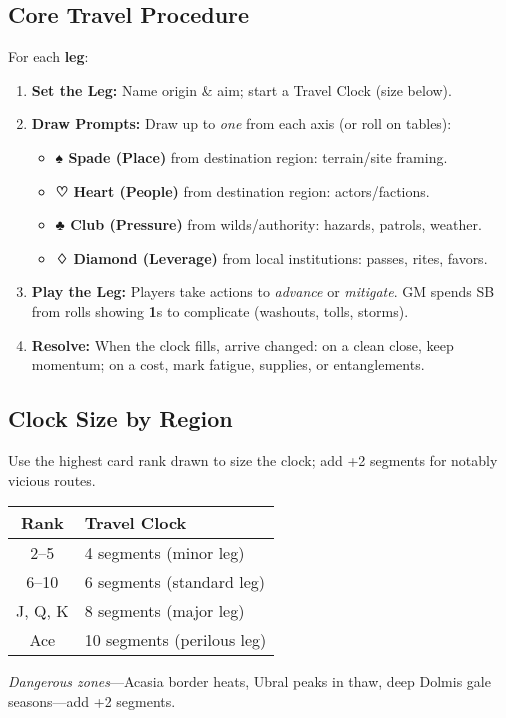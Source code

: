\begin{multicols}{2}
\subsection*{Core Travel Procedure}
For each \textbf{leg}:
\begin{enumerate}
  \item \textbf{Set the Leg:} Name origin \& aim; start a Travel Clock (size below).
  \item \textbf{Draw Prompts:} Draw up to \emph{one} from each axis (or roll on tables):
  \begin{itemize}
    \item \textbf{♠ Spade (Place)} from destination region: terrain/site framing.
    \item \textbf{♡ Heart (People)} from destination region: actors/factions.
    \item \textbf{♣ Club (Pressure)} from wilds/authority: hazards, patrols, weather.
    \item \textbf{♢ Diamond (Leverage)} from local institutions: passes, rites, favors.
  \end{itemize}
  \item \textbf{Play the Leg:} Players take actions to \emph{advance} or \emph{mitigate}. GM spends SB from rolls showing \textbf{1}s to complicate (washouts, tolls, storms).
  \item \textbf{Resolve:} When the clock fills, arrive changed: on a clean close, keep momentum; on a cost, mark fatigue, supplies, or entanglements.
\end{enumerate}

\subsection*{Clock Size by Region}
Use the highest card rank drawn to size the clock; add +2 segments for notably vicious routes.
\begin{center}
\begin{tabular}{cl}
\toprule
\textbf{Rank} & \textbf{Travel Clock} \\
\midrule
2–5 & 4 segments (minor leg) \\
6–10 & 6 segments (standard leg) \\
J, Q, K & 8 segments (major leg) \\
Ace & 10 segments (perilous leg) \\
\bottomrule
\end{tabular}
\end{center}
\emph{Dangerous zones}—Acasia border heats, Ubral peaks in thaw, deep Dolmis gale seasons—add +2 segments.


\end{multicols}

